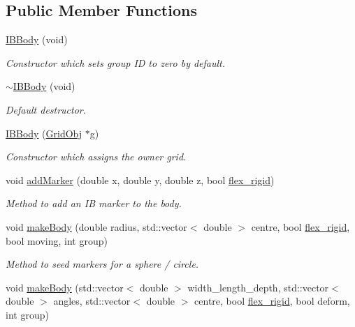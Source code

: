 \subsection*{Public Member Functions}
\begin{DoxyCompactItemize}
\item 
\hyperlink{class_i_b_body_a5fbec47db22b9d525724f232d1d81037}{I\+B\+Body} (void)
\begin{DoxyCompactList}\small\item\em Constructor which sets group ID to zero by default. \end{DoxyCompactList}\item 
\hyperlink{class_i_b_body_afe26e702d31e91f562aecd04a5f5c7f0}{$\sim$\+I\+B\+Body} (void)
\begin{DoxyCompactList}\small\item\em Default destructor. \end{DoxyCompactList}\item 
\hyperlink{class_i_b_body_a6ed4dfc0a45739239193b51f415ac5db}{I\+B\+Body} (\hyperlink{class_grid_obj}{Grid\+Obj} $\ast$g)
\begin{DoxyCompactList}\small\item\em Constructor which assigns the owner grid. \end{DoxyCompactList}\item 
void \hyperlink{class_i_b_body_aafa9573e6787bf3b6f07fd3880452b89}{add\+Marker} (double x, double y, double z, bool \hyperlink{class_i_b_body_a526f3e83b45b991a79941ee745698ea5}{flex\+\_\+rigid})
\begin{DoxyCompactList}\small\item\em Method to add an IB marker to the body. \end{DoxyCompactList}\item 
void \hyperlink{class_i_b_body_af26b0107e612dab7cd1e73bac1f4f234}{make\+Body} (double radius, std\+::vector$<$ double $>$ centre, bool \hyperlink{class_i_b_body_a526f3e83b45b991a79941ee745698ea5}{flex\+\_\+rigid}, bool moving, int group)
\begin{DoxyCompactList}\small\item\em Method to seed markers for a sphere / circle. \end{DoxyCompactList}\item 
void \hyperlink{class_i_b_body_a5c3f3da65bdaca7bee4ebea5a06b8bdd}{make\+Body} (std\+::vector$<$ double $>$ width\+\_\+length\+\_\+depth, std\+::vector$<$ double $>$ angles, std\+::vector$<$ double $>$ centre, bool \hyperlink{class_i_b_body_a526f3e83b45b991a79941ee745698ea5}{flex\+\_\+rigid}, bool deform, int group)

\end{DoxyCompactItemize}

